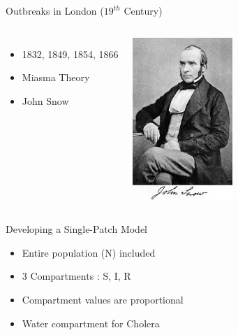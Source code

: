 \documentclass{beamer}\usepackage[]{graphicx}\usepackage[]{color}
\begin{document}
\begin{frame}{Outbreaks in London ($19^{th}$ Century)}
\begin{columns}[onlytextwidth]
\begin{itemize}
\setlength\itemsep{2em}
\item 1832, 1849, 1854, 1866
\item Miasma Theory
\item John Snow
\end{itemize}
\includegraphics[width=0.65\textwidth]{images/Snow.jpg}
\end{columns}
\end{frame}

\begin{frame}{Developing a Single-Patch Model}
\begin{itemize}
\setlength\itemsep{2em}
\item Entire population (N) included
\item 3 Compartments : S, I, R
\item Compartment values are proportional
\item Water compartment for Cholera
\end{itemize}
\end{frame}
\end{document}
